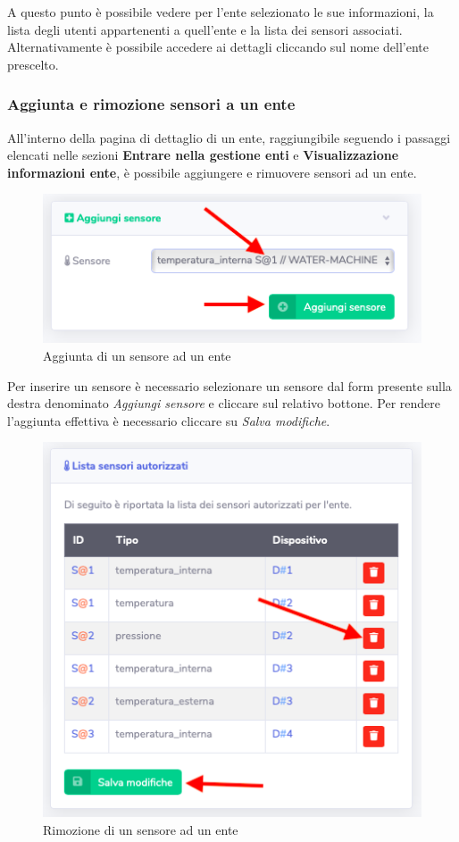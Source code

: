 		A questo punto è possibile vedere per l'ente selezionato le sue informazioni, la lista degli utenti appartenenti a quell'ente e la lista dei sensori associati.
		Alternativamente è possibile accedere ai dettagli cliccando sul nome dell'ente prescelto.

	\subsubsection{Aggiunta e rimozione sensori a un ente}

		All'interno della pagina di dettaglio di un ente, raggiungibile seguendo i passaggi elencati nelle sezioni \textbf{Entrare nella gestione enti} e \textbf{Visualizzazione informazioni ente}, è possibile aggiungere e rimuovere sensori ad un ente.

		\begin{figure}[H]
		\centering
		\includegraphics[scale=0.600]{res/images/admin/aggSensoreEnte.png}
		\caption{Aggiunta di un sensore ad un ente}
	\end{figure}

		Per inserire un sensore è necessario selezionare un sensore dal form presente sulla destra denominato \textit{Aggiungi sensore} e cliccare sul relativo bottone. Per rendere l'aggiunta effettiva è necessario cliccare su \textit{Salva modifiche}. 

		\begin{figure}[H]
		\centering
		\includegraphics[scale=0.600]{res/images/admin/rimSensoreEnte.png}
		\caption{Rimozione di un sensore ad un ente}
	\end{figure}

